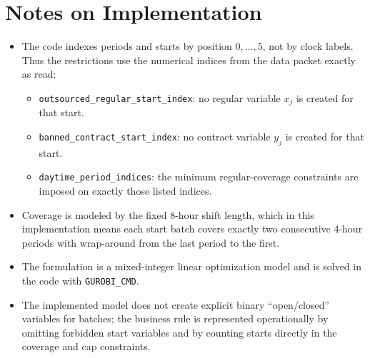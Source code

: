 \section*{Notes on Implementation}

\begin{itemize}
    \item The code indexes periods and starts by position $0,\dots,5$, not by clock labels. Thus the restrictions use the numerical indices from the data packet exactly as read:
    \begin{itemize}
        \item \texttt{outsourced\_regular\_start\_index}: no regular variable $x_j$ is created for that start.
        \item \texttt{banned\_contract\_start\_index}: no contract variable $y_j$ is created for that start.
        \item \texttt{daytime\_period\_indices}: the minimum regular-coverage constraints are imposed on exactly those listed indices.
    \end{itemize}
    \item Coverage is modeled by the fixed 8-hour shift length, which in this implementation means each start batch covers exactly two consecutive 4-hour periods with wrap-around from the last period to the first.
    \item The formulation is a mixed-integer linear optimization model and is solved in the code with \texttt{GUROBI\_CMD}.
    \item The implemented model does not create explicit binary ``open/closed'' variables for batches; the business rule is represented operationally by omitting forbidden start variables and by counting starts directly in the coverage and cap constraints.
\end{itemize}
